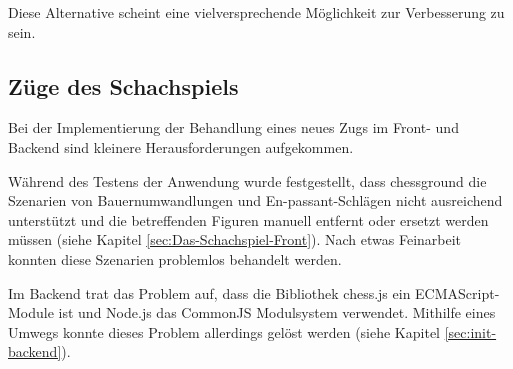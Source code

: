 Diese Alternative scheint eine vielversprechende Möglichkeit zur Verbesserung zu sein.

\subsection{Züge des Schachspiels}
Bei der Implementierung der Behandlung eines neues Zugs im Front- und Backend sind kleinere Herausforderungen aufgekommen.

Während des Testens der Anwendung wurde festgestellt, dass chessground die Szenarien von Bauernumwandlungen und En-passant-Schlägen nicht ausreichend unterstützt und die betreffenden Figuren manuell entfernt oder ersetzt werden müssen (siehe Kapitel \ref{sec:Das-Schachspiel-Front}). Nach etwas Feinarbeit konnten diese Szenarien problemlos behandelt werden.

Im Backend trat das Problem auf, dass die Bibliothek chess.js ein ECMAScript-Module ist und Node.js das CommonJS Modulsystem verwendet. Mithilfe eines Umwegs konnte dieses Problem allerdings gelöst werden (siehe Kapitel \ref{sec:init-backend}).

